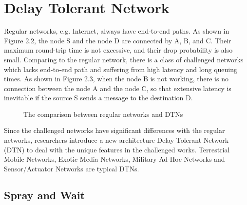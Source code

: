 \section{ Delay Tolerant Network}

\noindent Regular networks, e.g. Internet, always have end-to-end paths. As shown in Figure 2.2, the node S and the node D are connected by A, B, and C. Their maximum round-trip time is not excessive, and their drop probability is also small. Comparing to the regular network, there is a class of challenged networks \cite {C1} which lacks end-to-end path and suffering from high latency and long queuing times. As shown in Figure 2.3, when the node B is not working, there is no connection between the node A and the node C, so that extensive latency is inevitable if the source S sends a message to the destination D.

\begin{figure} [H]
  \centering 
  \hspace{1in} 
  \caption{The comparison between regular networks and DTNs} 
  \label{fig:comparison_RN_DTN} %
\end{figure}

\noindent Since the challenged networks have significant differences with the regular networks, researchers introduce a new architecture Delay Tolerant Network (DTN) to deal with the unique features in the challenged works. Terrestrial Mobile Networks, Exotic Media Networks, Military Ad-Hoc Networks and Sensor/Actuator Networks are typical DTNs.


\subsection{ Spray and Wait}

